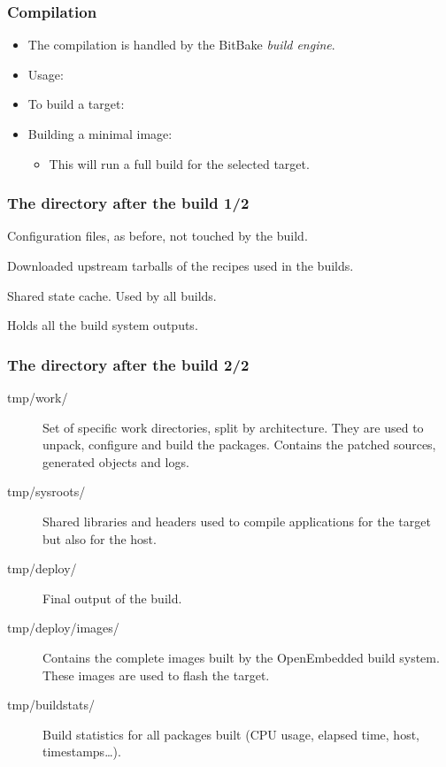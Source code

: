\begin{frame}
  \frametitle{Compilation}
  \begin{itemize}
    \item The compilation is handled by the BitBake {\em build
      engine}.
    \item Usage: 
    \item To build a target: 
    \item Building a minimal image: 
    \begin{itemize}
      \item This will run a full build for the selected target.
    \end{itemize}
  \end{itemize}
\end{frame}

\begin{frame}
  \frametitle{The  directory after the build 1/2}
  \begin{description}[style=nextline]
    \item[conf/] Configuration files, as before, not touched by the build.
    \item[downloads/] Downloaded upstream tarballs of the recipes
      used in the builds.
    \item[sstate-cache/] Shared state cache. Used by all builds.
    \item[tmp/] Holds all the build system outputs.
  \end{description}
\end{frame}

\begin{frame}
  \frametitle{The  directory after the build 2/2}
  \begin{description}
    \item[tmp/work/] Set of specific work directories, split by
      architecture. They are used to unpack, configure and build the
      packages. Contains the patched sources, generated objects and
      logs.
    \item[tmp/sysroots/] Shared libraries and headers used to compile
      applications for the target but also for the host.
    \item[tmp/deploy/] Final output of the build.
    \item[tmp/deploy/images/] Contains the complete images built by
      the OpenEmbedded build system. These images are used to flash
      the target.
    \item[tmp/buildstats/] Build statistics for all packages built
      (CPU usage, elapsed time, host, timestamps\dots).
  \end{description}
\end{frame}
